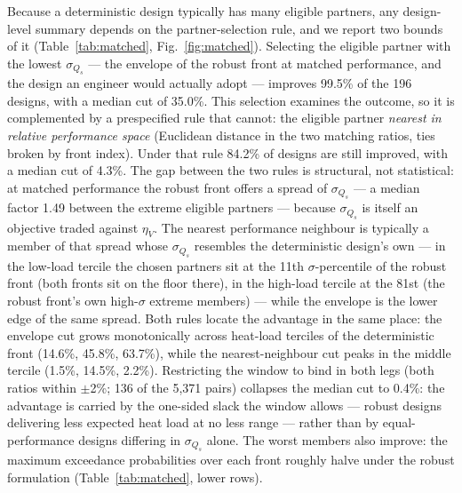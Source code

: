 Because a deterministic design typically has many eligible partners, any
design-level summary depends on the partner-selection rule, and we report
two bounds of it (Table~\ref{tab:matched}, Fig.~\ref{fig:matched}).
Selecting the eligible partner with the lowest $\sigma_{Q_s}$ --- the
envelope of the robust front at matched performance, and the design an
engineer would actually adopt --- improves 99.5\% of the 196 designs,
with a median cut of 35.0\%. This selection examines the outcome, so it
is complemented by a prespecified rule that cannot: the eligible partner
\emph{nearest in relative performance space} (Euclidean distance in the
two matching ratios, ties broken by front index). Under that rule 84.2\%
of designs are still improved, with a median cut of 4.3\%. The gap
between the two rules is structural, not statistical: at matched
performance the robust front offers a spread of $\sigma_{Q_s}$ --- a
median factor 1.49 between the extreme eligible partners --- because
$\sigma_{Q_s}$ is itself an objective traded against $\eta_V$. The
nearest performance neighbour is typically a member of that spread whose
$\sigma_{Q_s}$ resembles the deterministic design's own --- in the
low-load tercile the chosen partners sit at the 11th
$\sigma$-percentile of the robust front (both fronts sit on the floor
there), in the high-load tercile at the 81st (the robust front's own
high-$\sigma$ extreme members) --- while the envelope is the lower edge
of the same spread. Both rules locate the advantage in the same place:
the envelope cut grows monotonically across heat-load terciles of the
deterministic front (14.6\%, 45.8\%, 63.7\%), while the
nearest-neighbour cut peaks in the middle tercile (1.5\%, 14.5\%,
2.2\%). Restricting the window to bind in both legs (both ratios
within $\pm$2\%; 136 of the 5{,}371 pairs) collapses the median cut to
0.4\%: the advantage is carried by the one-sided slack the window
allows --- robust designs delivering less expected heat load at no less
range --- rather than by equal-performance designs differing in
$\sigma_{Q_s}$ alone. The worst members also improve: the maximum exceedance
probabilities over each front roughly halve under the robust formulation
(Table~\ref{tab:matched}, lower rows).

